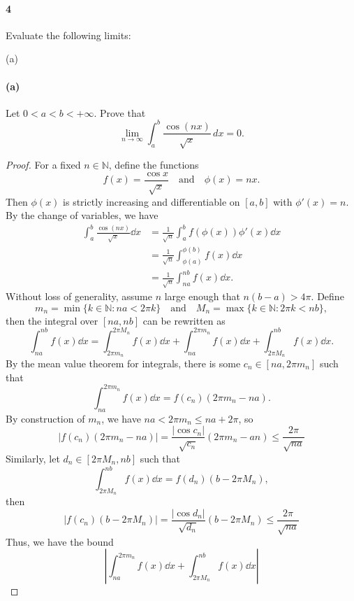 \documentclass[12pt]{article}
\newenvironment{fullbox}{\begin{lrbox}{\savefullbox}\begin{minipage}{\dimexpr\textwidth-2\fboxsep\relax}}{\end{minipage}\end{lrbox}\begin{center}\framebox[\textwidth]{\usebox{\savefullbox}}\end{center}}
\newenvironment{pbox}[1][]{\begin{fullbox}\ifx#1\empty\else\paragraph{#1}\fi}{\end{fullbox}}
\theoremstyle{definition}
\newcommand{\isp}[1]{\quad\text{#1}\quad}
\newcommand{\N}{\mathbb{N}}
\begin{document}
\newpage
\begin{pbox}[4]
    Evaluate the following limits: 
\end{pbox}

\begin{pbox}[(a)]
    Let $0<a<b<+\infty$. Prove that 
    \begin{equation}
    \lim_{n\to \infty} \int_a^b \frac{\cos(nx)}{\sqrt{x}}\,dx = 0.
    \end{equation}
\end{pbox}

\begin{proof}
    For a fixed $n \in \N$, define the functions
    \[
        f(x) = \frac{\cos x}{\sqrt{x}}
        \isp{and}
        \phi(x) = nx.
    \]
    Then $\phi(x)$ is strictly increasing and differentiable on $[a,b]$ with $\phi'(x) = n$. By the change of variables, we have
    \begin{align*}
        \int_a^b \frac{\cos(nx)}{\sqrt{x}} \dd{x}
            &= \frac{1}{\sqrt{n}} \int_{a}^{b} f(\phi(x)) \phi'(x) \dd{x} \\
            &= \frac{1}{\sqrt{n}} \int_{\phi(a)}^{\phi(b)} f(x) \dd{x} \\
            &= \frac{1}{\sqrt{n}} \int_{na}^{nb} f(x) \dd{x}.
    \end{align*}
    Without loss of generality, assume $n$ large enough that $n(b-a) > 4\pi$. Define
    \[
        m_n = \min\{k \in \N : na < 2\pi k\}
        \isp{and}
        M_n = \max\{k \in \N : 2\pi k < nb\},
    \]
    then the integral over $[na, nb]$ can be rewritten as
    \[
        \int_{na}^{nb} f(x) \dd{x}
            = \int_{2\pi m_n}^{2\pi M_n} f(x) \dd{x}
                + \int_{na}^{2\pi m_n} f(x) \dd{x}
                + \int_{2\pi M_n}^{nb} f(x) \dd{x}.
    \]
    By the mean value theorem for integrals, there is some $c_n \in [na,2 \pi m_n]$ such that
    \[
        \int_{na}^{2\pi m_n} f(x) \dd{x} = f(c_n)(2\pi m_n - na).
    \]
    By construction of $m_n$, we have $na < 2\pi m_n \leq  na + 2\pi$, so
    \[
        |f(c_n)(2\pi m_n - na)|
            = \frac{|\cos c_n|}{\sqrt{c_n}} (2\pi m_n - an)
            \leq \frac{2\pi}{\sqrt{na}}
    \]
    Similarly, let $d_n \in [2\pi M_n, nb]$ such that
    \[
        \int_{2\pi M_n}^{nb} f(x) \dd{x} = f(d_n)(b - 2\pi M_n),
    \]
    then
    \[
        |f(c_n)(b - 2\pi M_n)|
            = \frac{|\cos d_n|}{\sqrt{d_n}} (b - 2\pi M_n)
            \leq \frac{2\pi}{\sqrt{na}}
    \]
    Thus, we have the bound
    \[
        \left|\int_{na}^{2\pi m_n} f(x) \dd{x} + \int_{2\pi M_n}^{nb} f(x) \dd{x}\right|
\]
\end{proof}
\end{document}
